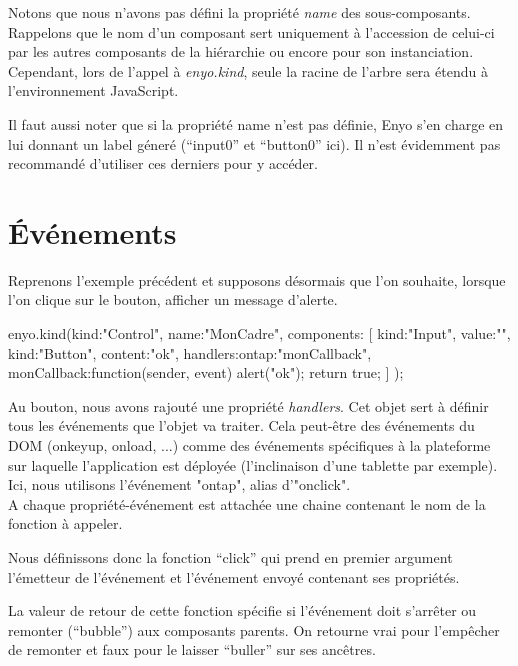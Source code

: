 \documentclass[11pt,a4paper]{report}
\begin{document}
Notons que nous n'avons pas défini la propriété \emph{name} des sous-composants. 
Rappelons que le nom d'un composant sert uniquement à l'accession de celui-ci par les 
autres composants de la hiérarchie ou encore pour son instanciation. Cependant, lors de
l'appel à \emph{enyo.kind}, seule la racine de l'arbre sera étendu à l'environnement JavaScript.

Il faut aussi noter que si la propriété name n'est pas définie, Enyo s'en charge en lui donnant 
un label géneré (``input0'' et ``button0'' ici). Il n'est évidemment pas recommandé 
d'utiliser ces derniers pour y accéder.

\section{\'Evénements}\label{sec:event}

Reprenons l'exemple précédent et supposons désormais que l'on souhaite, lorsque l'on clique sur le bouton, afficher un message d'alerte.

\begin{JavaScript}
enyo.kind({kind:"Control",
           name:"MonCadre",
           components: [
             {kind:"Input", value:""},
             {kind:"Button", content:"ok",
              handlers:{ontap:"monCallback"},
              monCallback:function(sender, event){
                alert("ok");
                return true;
              }
             }
           ]
       	  });
\end{JavaScript}

Au bouton, nous avons rajouté une propriété \emph{handlers}. 
Cet objet sert à définir tous les événements que l'objet va traiter. 
Cela peut-être des événements du DOM (onkeyup, onload, ...) comme des événements 
spécifiques à la plateforme sur laquelle l'application est déployée 
(l'inclinaison d'une tablette par exemple). Ici, nous utilisons l'événement "ontap", alias d'"onclick".\\

A chaque propriété-événement est attachée une chaine contenant le nom de la fonction à appeler.

Nous définissons donc la fonction ``click'' qui prend en premier argument l'émetteur de 
l'événement et l'événement envoyé contenant ses propriétés.

La valeur de retour de cette fonction spécifie si l'événement doit s'arrêter ou 
remonter (``bubble'') aux composants parents. On retourne vrai pour l'empêcher de 
remonter et faux pour le laisser ``buller'' sur ses ancêtres.
\end{document}
